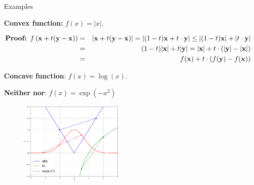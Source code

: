 \begin{vbframe}{Examples}

\textbf{Convex function:} $f(x) = |x|$. \\
\begin{footnotesize}

\vspace*{-0.5cm}

\begin{eqnarray*}
\textbf{Proof: } f\left(\mathbf{x} + t(\mathbf{y} - \mathbf{x})\right) &=& |\mathbf{x} + t(\mathbf{y} - \mathbf{x})| = |(1 - t) \mathbf{x} + t\cdot\mathbf{y}| \le |(1 - t) \mathbf{x}| + |t\cdot\mathbf{y}| \\ &=& (1 - t) |\mathbf{x}| + t |\mathbf{y}| = |\mathbf{x}| + t \cdot (|\mathbf{y}| - |\mathbf{x}|) \\ &=& f(\mathbf{x}) + t \cdot (f(\mathbf{y}) - f(\mathbf{x}))
\end{eqnarray*}
\end{footnotesize}

\vspace*{-0.5cm}

\textbf{Concave function}: $f(x) = \log(x)$. 

\vspace*{0.2cm}

\textbf{Neither nor}: $f(x) = \exp(-x^2)$

\begin{figure}
    \centering
    \includegraphics[width=0.45\textwidth]{figure_man/conv_conc_functions.png}
\end{figure}

\end{vbframe}




